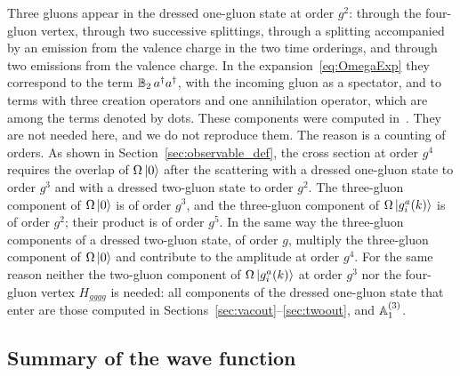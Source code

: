Three gluons appear in the dressed one-gluon state at order $g^2$: through the four-gluon vertex, through two successive splittings, through a splitting accompanied by an emission from the valence charge in the two time orderings, and through two emissions from the valence charge. In the expansion~\eqref{eq:OmegaExp} they correspond to the term $\mathbb{B}_2\,a^\dagger a^\dagger$, with the incoming gluon as a spectator, and to terms with three creation operators and one annihilation operator, which are among the terms denoted by dots. These components were computed in~\cite{Radhakrishnan:2026soft}. They are not needed here, and we do not reproduce them. The reason is a counting of orders. As shown in Section~\ref{sec:observable_def}, the cross section at order $g^4$ requires the overlap of $\Omega\ket0$ after the scattering with a dressed one-gluon state to order $g^3$ and with a dressed two-gluon state to order $g^2$. The three-gluon component of $\Omega\ket0$ is of order $g^3$, and the three-gluon component of $\Omega\ket{g^a_i(k)}$ is of order $g^2$; their product is of order $g^5$. In the same way the three-gluon components of a dressed two-gluon state, of order $g$, multiply the three-gluon component of $\Omega\ket0$ and contribute to the amplitude at order $g^4$. For the same reason neither the two-gluon component of $\Omega\ket{g^a_i(k)}$ at order $g^3$ nor the four-gluon vertex $H_{gggg}$ is needed: all components of the dressed one-gluon state that enter are those computed in Sections~\ref{sec:vacout}--\ref{sec:twoout}, and $\mathbb{A}^{(3)}_1$.


\subsection{Summary of the wave function}\label{sec:summarywf}


